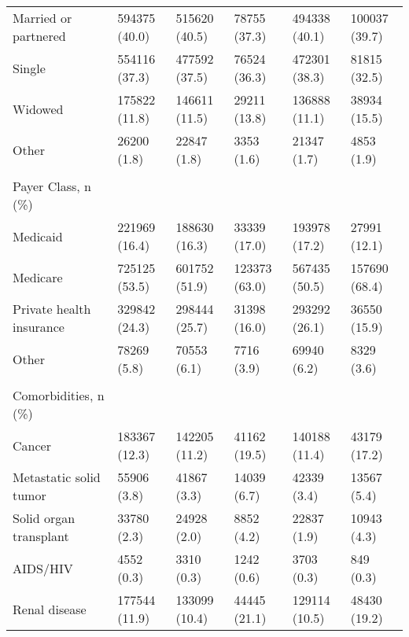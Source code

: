 \begin{adjustbox}{width={\textwidth},totalheight={\textheight},keepaspectratio,frame,padding=0ex 0ex -910ex 0ex}
{\begin{tabular}{L{20em}C{10em}C{10em}C{10em}C{10em}C{10em}}
\hspace{3mm} Married or partnered & 594375 (40.0) & 515620 (40.5) & 78755 (37.3) & 494338 (40.1) & 100037 (39.7)\\
\hspace{3mm} Single & 554116 (37.3) & 477592 (37.5) & 76524 (36.3) & 472301 (38.3) & 81815 (32.5)\\
\hspace{3mm} Widowed & 175822 (11.8) & 146611 (11.5) & 29211 (13.8) & 136888 (11.1) & 38934 (15.5)\\
\hspace{3mm} Other & 26200 (1.8) & 22847 (1.8) & 3353 (1.6) & 21347 (1.7) & 4853 (1.9)\\
&  &  &  &  & \\
Payer Class, n (\%)  & &    &     &        &         \\
\hspace{3mm} Medicaid & 221969 (16.4) & 188630 (16.3) & 33339 (17.0) & 193978 (17.2) & 27991 (12.1)\\
\hspace{3mm} Medicare & 725125 (53.5) & 601752 (51.9) & 123373 (63.0) & 567435 (50.5) & 157690 (68.4)\\
\hspace{3mm} Private health insurance & 329842 (24.3) & 298444 (25.7) & 31398 (16.0) & 293292 (26.1) & 36550 (15.9)\\
\hspace{3mm} Other & 78269 (5.8) & 70553 (6.1) & 7716 (3.9) & 69940 (6.2) & 8329 (3.6)\\
&  &  &  &  & \\
Comorbidities, n (\%)   & &    &     &        &         \\
\hspace{3mm} Cancer &  183367 (12.3) & 142205 (11.2) & 41162 (19.5) & 140188 (11.4) & 43179 (17.2)\\
\hspace{3mm} Metastatic solid tumor & 55906 (3.8) & 41867 (3.3) & 14039 (6.7) & 42339 (3.4) & 13567 (5.4)\\
\hspace{3mm} Solid organ transplant & 33780 (2.3) & 24928 (2.0) & 8852 (4.2) & 22837 (1.9) & 10943 (4.3)\\
\hspace{3mm} AIDS/HIV & 4552 (0.3) & 3310 (0.3) & 1242 (0.6) & 3703 (0.3) & 849 (0.3)\\
\hspace{3mm} Renal disease  & 177544 (11.9) & 133099 (10.4) & 44445 (21.1) & 129114 (10.5) & 48430 (19.2)\\

\end{tabular}}
\end{adjustbox}
